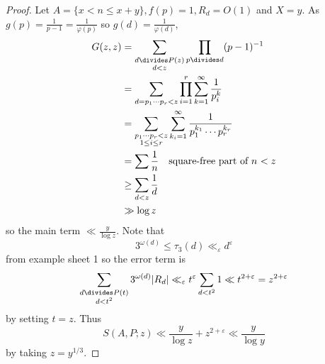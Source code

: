 \documentclass[a4paper]{article}
\theoremstyle{definition}
\begin{document}
\begin{proof}
  Let \(A = \{x < n \leq x + y\}, f(p) = 1, R_d = O(1)\) and \(X = y\). As \(g(p) = \frac{1}{p - 1} = \frac{1}{\varphi(p)}\) so \(g(d) = \frac{1}{\varphi(d)}\),
  \begin{align*}
    G(z, z)
    &= \sum_{\substack{d \divides P(z) \\ d < z}} \prod_{p \divides d} (p - 1)^{-1} \\
    &= \sum_{d = p_1 \cdots p_r < z} \prod_{i = 1}^r \sum_{k = 1}^\infty \frac{1}{p_i^k} \\
    &= \sum_{\substack{p_1 \cdots p_r < z \\ 1 \leq i \leq r}} \sum_{k_i = 1}^\infty \frac{1}{p_1^{k_1} \cdots p_r^{k_r}} \\
    &= \sum \frac{1}{n} \quad \text{square-free part of \(n\) \(< z\)} \\
    &\geq \sum_{d < z} \frac{1}{d} \\
    &\gg \log z
  \end{align*}
  so the main term \(\ll \frac{y}{\log z}\). Note that
  \[
    3^{\omega(d)} \leq \tau_3(d) \ll_\varepsilon d^\varepsilon
  \]
  from example sheet 1 so the error term is
  \[
    \sum_{\substack{d \divides P(t) \\ d < t^2}} 3^{\omega(d)} |R_d|
    \ll_\varepsilon t^\varepsilon \sum_{d < t^2} 1
    \ll t^{2 + \varepsilon} = z^{2 + \varepsilon}
  \]
  by setting \(t = z\). Thus
  \[
    S(A, P; z) \ll \frac{y}{\log z} + z^{2 + \varepsilon} \ll \frac{y}{\log y}
  \]
  by taking \(z = y^{1/3}\).
\end{proof}
\end{document}
